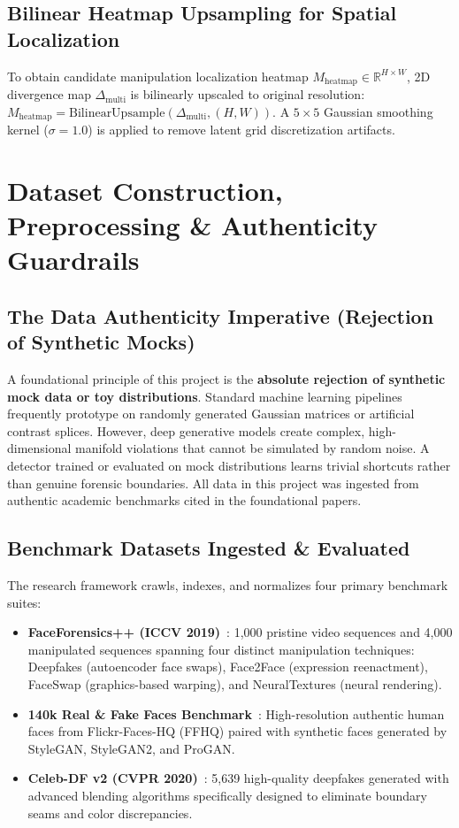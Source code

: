 \documentclass[12pt,a4paper]{report}
\begin{document}
\section{Bilinear Heatmap Upsampling for Spatial Localization}
To obtain candidate manipulation localization heatmap $M_{\text{heatmap}} \in \mathbb{R}^{H \times W}$, 2D divergence map $\Delta_{\text{multi}}$ is bilinearly upscaled to original resolution: $M_{\text{heatmap}} = \text{BilinearUpsample}(\Delta_{\text{multi}}, (H, W))$. A $5 \times 5$ Gaussian smoothing kernel ($\sigma=1.0$) is applied to remove latent grid discretization artifacts.

\clearpage

\chapter{Dataset Construction, Preprocessing \& Authenticity Guardrails}

\section{The Data Authenticity Imperative (Rejection of Synthetic Mocks)}
A foundational principle of this project is the \textbf{absolute rejection of synthetic mock data or toy distributions}. Standard machine learning pipelines frequently prototype on randomly generated Gaussian matrices or artificial contrast splices. However, deep generative models create complex, high-dimensional manifold violations that cannot be simulated by random noise. A detector trained or evaluated on mock distributions learns trivial shortcuts rather than genuine forensic boundaries. All data in this project was ingested from authentic academic benchmarks cited in the foundational papers.

\section{Benchmark Datasets Ingested \& Evaluated}
The research framework crawls, indexes, and normalizes four primary benchmark suites:
\begin{itemize}
    \item \textbf{FaceForensics++ (ICCV 2019)}~\cite{rossler2019faceforensics}: 1,000 pristine video sequences and 4,000 manipulated sequences spanning four distinct manipulation techniques: Deepfakes (autoencoder face swaps), Face2Face (expression reenactment), FaceSwap (graphics-based warping), and NeuralTextures (neural rendering).
    \item \textbf{140k Real \& Fake Faces Benchmark}~\cite{guarnera2024mastering}: High-resolution authentic human faces from Flickr-Faces-HQ (FFHQ) paired with synthetic faces generated by StyleGAN, StyleGAN2, and ProGAN.
    \item \textbf{Celeb-DF v2 (CVPR 2020)}~\cite{li2020celebdf}: 5,639 high-quality deepfakes generated with advanced blending algorithms specifically designed to eliminate boundary seams and color discrepancies.
\end{itemize}
\end{document}
